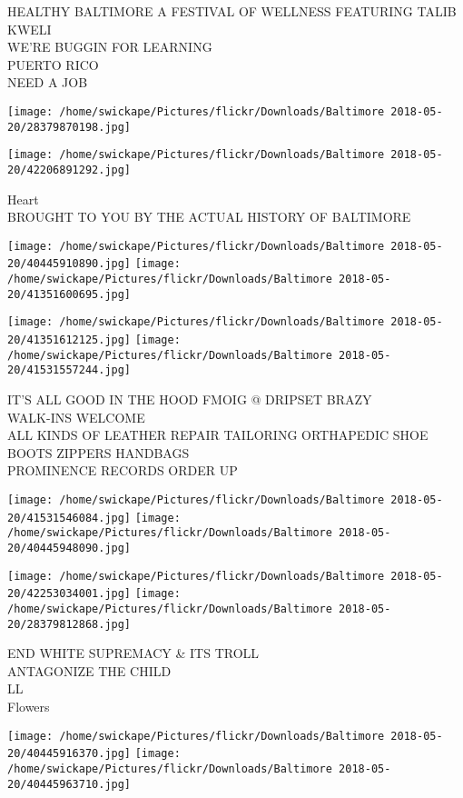\documentclass[10pt,letterpaper]{article}
\begin{document}
HEALTHY BALTIMORE A FESTIVAL OF WELLNESS FEATURING TALIB KWELI\\
WE'RE BUGGIN FOR LEARNING\\
PUERTO RICO\\
NEED A JOB
\pagebreak

\texttt{[image: /home/swickape/Pictures/flickr/Downloads/Baltimore 2018-05-20/28379870198.jpg]}

\vspace{0.25in}
\texttt{[image: /home/swickape/Pictures/flickr/Downloads/Baltimore 2018-05-20/42206891292.jpg]}

Heart\\
BROUGHT TO YOU BY THE ACTUAL HISTORY OF BALTIMORE
\pagebreak

\texttt{[image: /home/swickape/Pictures/flickr/Downloads/Baltimore 2018-05-20/40445910890.jpg]}
\texttt{[image: /home/swickape/Pictures/flickr/Downloads/Baltimore 2018-05-20/41351600695.jpg]}

\texttt{[image: /home/swickape/Pictures/flickr/Downloads/Baltimore 2018-05-20/41351612125.jpg]}
\texttt{[image: /home/swickape/Pictures/flickr/Downloads/Baltimore 2018-05-20/41531557244.jpg]}

IT'S ALL GOOD IN THE HOOD FMOIG @ DRIPSET BRAZY\\
WALK{-}INS WELCOME\\
ALL KINDS OF LEATHER REPAIR TAILORING ORTHAPEDIC  SHOE BOOTS ZIPPERS HANDBAGS\\
PROMINENCE RECORDS ORDER UP
\pagebreak

\texttt{[image: /home/swickape/Pictures/flickr/Downloads/Baltimore 2018-05-20/41531546084.jpg]}
\texttt{[image: /home/swickape/Pictures/flickr/Downloads/Baltimore 2018-05-20/40445948090.jpg]}

\texttt{[image: /home/swickape/Pictures/flickr/Downloads/Baltimore 2018-05-20/42253034001.jpg]}
\texttt{[image: /home/swickape/Pictures/flickr/Downloads/Baltimore 2018-05-20/28379812868.jpg]}

END WHITE SUPREMACY \& ITS TROLL\\
ANTAGONIZE THE CHILD\\
LL\\
Flowers
\pagebreak

\texttt{[image: /home/swickape/Pictures/flickr/Downloads/Baltimore 2018-05-20/40445916370.jpg]}
\texttt{[image: /home/swickape/Pictures/flickr/Downloads/Baltimore 2018-05-20/40445963710.jpg]}
\end{document}
